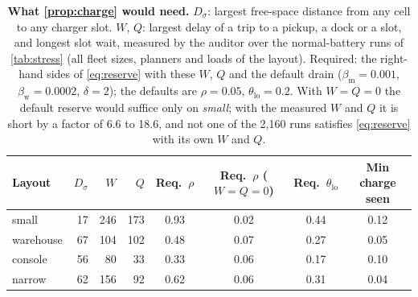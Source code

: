 \begin{table}[t]
\centering
\caption{\textbf{What \cref{prop:charge} would need.} $D_\sigma$: largest free-space distance from any cell to any charger slot. $W$, $Q$: largest delay of a trip to a pickup, a dock or a slot, and longest slot wait, measured by the auditor over the normal-battery runs of \cref{tab:stress} (all fleet sizes, planners and loads of the layout). Required: the right-hand sides of \cref{eq:reserve} with these $W$, $Q$ and the default drain ($\beta_{\mathrm{m}}{=}0.001$, $\beta_{\mathrm{w}}{=}0.0002$, $\delta{=}2$); the defaults are $\rho{=}0.05$, $\theta_{\mathrm{lo}}{=}0.2$. With $W{=}Q{=}0$ the default reserve would suffice only on \emph{small}; with the measured $W$ and $Q$ it is short by a factor of 6.6 to 18.6, and not one of the 2{,}160 runs satisfies \cref{eq:reserve} with its own $W$ and $Q$.}
\label{tab:reserve}
\footnotesize
\setlength{\tabcolsep}{4pt}
\begin{tabular}{lrrrcccc}
\toprule
\textbf{Layout} & $D_\sigma$ & $W$ & $Q$ & \textbf{Req.\ $\rho$} & \textbf{Req.\ $\rho$ ($W{=}Q{=}0$)} & \textbf{Req.\ $\theta_{\mathrm{lo}}$} & \textbf{Min charge seen}\\
\midrule
small & 17 & 246 & 173 & 0.93 & 0.02 & 0.44 & 0.12\\
warehouse & 67 & 104 & 102 & 0.48 & 0.07 & 0.27 & 0.05\\
console & 56 & 80 & 33 & 0.33 & 0.06 & 0.17 & 0.10\\
narrow & 62 & 156 & 92 & 0.62 & 0.06 & 0.31 & 0.04\\
\bottomrule
\end{tabular}
\end{table}
